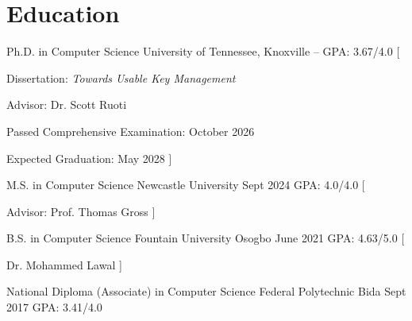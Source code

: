 
\section{Education}

\begin{degrees}
	\degree
		{Ph.D. in Computer Science}
		{University of Tennessee, Knoxville}
		{--}
		{GPA: 3.67/4.0}
		[
			\item Dissertation: \textit{Towards Usable Key Management}
			\item Advisor: Dr. Scott Ruoti
			\item Passed Comprehensive Examination: October 2026 
			\item Expected Graduation: May 2028
		]
	
	\degree
		{M.S. in Computer Science}
		{Newcastle University}
		{Sept 2024}
		{GPA: 4.0/4.0}
		[
			\item Advisor: Prof. Thomas Gross
		]
	
	\degree
		{B.S. in Computer Science}
		{Fountain University Osogbo}
		{June 2021}
		{GPA: 4.63/5.0}
		[
			\item Dr. Mohammed Lawal
		]

	\degree
		{National Diploma (Associate) in Computer Science}
		{Federal Polytechnic Bida}
		{Sept 2017}
		{GPA: 3.41/4.0}
	
\end{degrees}